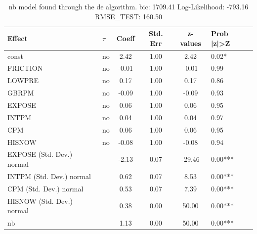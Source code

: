 \begin{table}
	\caption{nb model found through the de algorithm. bic: 1709.41 Log-Likelihood: -793.16 RMSE_TEST: 160.50}
	\begin{center}
		\begin{tabular}{|l|l|c|c|c|l|}
			\hline
			Effect & $\tau$ & Coeff & Std. Err & z-values & Prob |z|>Z \\
			\hline
			const & no & 2.42 & 1.00 & 2.42 & 0.02* \\
			\hline
			FRICTION & no & -0.01 & 1.00 & -0.01 & 0.99 \\
			\hline
			LOWPRE & no & 0.17 & 1.00 & 0.17 & 0.86 \\
			\hline
			GBRPM & no & -0.09 & 1.00 & -0.09 & 0.93 \\
			\hline
			EXPOSE & no & 0.06 & 1.00 & 0.06 & 0.95 \\
			\hline
			INTPM & no & 0.04 & 1.00 & 0.04 & 0.97 \\
			\hline
			CPM & no & 0.06 & 1.00 & 0.06 & 0.95 \\
			\hline
			HISNOW & no & -0.08 & 1.00 & -0.08 & 0.94 \\
			\hline
			EXPOSE (Std. Dev.) normal &  & -2.13 & 0.07 & -29.46 & 0.00*** \\
			\hline
			INTPM (Std. Dev.) normal &  & 0.62 & 0.07 & 8.53 & 0.00*** \\
			\hline
			CPM (Std. Dev.) normal &  & 0.53 & 0.07 & 7.39 & 0.00*** \\
			\hline
			HISNOW (Std. Dev.) normal &  & 0.38 & 0.00 & 50.00 & 0.00*** \\
			\hline
			nb &  & 1.13 & 0.00 & 50.00 & 0.00*** \\
			\hline
		\end{tabular}
	\end{center}
\end{table}